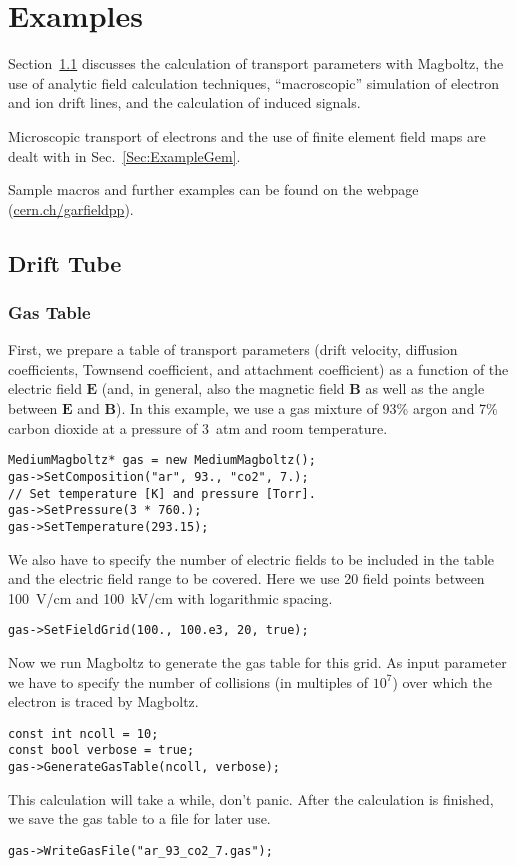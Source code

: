 \section{Examples}

Section~\ref{Sec:ExampleTube} discusses the 
calculation of transport parameters with Magboltz, 
the use of analytic field calculation techniques, 
``macroscopic'' simulation of electron and ion drift lines, 
and the calculation of induced signals. 
 
Microscopic transport of electrons and 
the use of finite element field maps are dealt with in 
Sec.~\ref{Sec:ExampleGem}. 

Sample macros and further examples can be found on the webpage 
(\href{http://garfieldpp.web.cern.ch/garfieldpp/}{cern.ch/garfieldpp}). 
 
\subsection{Drift Tube}\label{Sec:ExampleTube}

\subsubsection{Gas Table}
First, we prepare a table of transport parameters 
(drift velocity, diffusion coefficients, Townsend coefficient,
and attachment coefficient) as a function 
of the electric field \(\mathbf{E}\)  
(and, in general, also the magnetic field \(\mathbf{B}\) 
as well as the angle between \(\mathbf{E}\) and \(\mathbf{B}\)).
In this example, we use a gas mixture of 93\% argon and 7\% 
carbon dioxide at a pressure of 3~atm and room temperature.
\begin{lstlisting}
MediumMagboltz* gas = new MediumMagboltz();
gas->SetComposition("ar", 93., "co2", 7.);
// Set temperature [K] and pressure [Torr].
gas->SetPressure(3 * 760.);
gas->SetTemperature(293.15);
\end{lstlisting} 
We also have to specify the number of electric fields to be 
included in the table and the electric field range to be covered. 
Here we use 20 field points between 100~V/cm and 100~kV/cm 
with logarithmic spacing. 
\begin{lstlisting}
gas->SetFieldGrid(100., 100.e3, 20, true);
\end{lstlisting}
Now we run Magboltz to generate the gas table for this grid. 
As input parameter we have to specify the number of collisions 
(in multiples of \(10^{7}\)) over which the electron is traced 
by Magboltz.
\begin{lstlisting}
const int ncoll = 10;
const bool verbose = true;
gas->GenerateGasTable(ncoll, verbose);
\end{lstlisting}
This calculation will take a while, don't panic. 
After the calculation is finished, we save the gas table to a 
file for later use.
\begin{lstlisting}
gas->WriteGasFile("ar_93_co2_7.gas");
\end{lstlisting}

